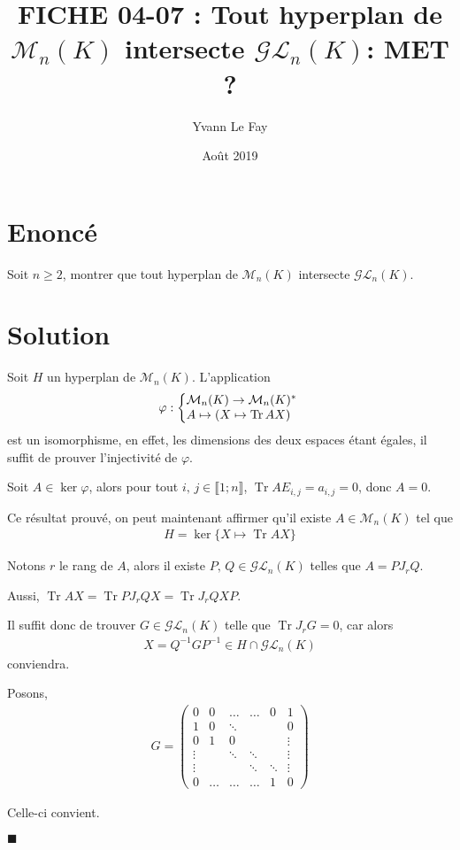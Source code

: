 \documentclass{article}
\newcommand*{\QED}{\hfill\ensuremath{\blacksquare}}%
\DeclareMathOperator{\tr}{Tr}
\begin{document}
\title{FICHE 04-07 : Tout hyperplan de $\mathcal{M}_n(K)$ intersecte $\mathcal{G}\mathcal{L}_n(K)$: MET ? }
\author{Yvann Le Fay}
\date{Août 2019}
\maketitle 
\section*{Enoncé}
Soit $n\geq 2$, montrer que tout hyperplan de $\mathcal{M}_n(K)$ intersecte $\mathcal{G}\mathcal{L}_n(K)$.
\section*{Solution}
Soit $H$ un hyperplan de $\mathcal{M}_n(K)$. L'application 
\begin{align*}
	\varphi : \left\{
		\begin{array}{@{}l@{\thinspace}l}
			\mathcal{M}_n(K)\to \mathcal{M}_n(K)^*\\
			A \mapsto (X\mapsto \tr{AX})
		\end{array}
	\right.
\end{align*}
est un isomorphisme, en effet, les dimensions des deux espaces étant égales, il suffit de prouver l'injectivité de $\varphi$.

Soit $A\in \ker \varphi$, alors pour tout $i,\,j\in \llbracket 1;n\rrbracket$, $\tr{AE_{i,j}} = a_{i,j} = 0$, donc $A=0$. 

Ce résultat prouvé, on peut maintenant affirmer qu'il existe $A\in \mathcal{M}_n(K)$ tel que 
\begin{align*}
	H = \ker \{X \mapsto \tr{AX}\}
\end{align*}

Notons $r$ le rang de $A$, alors il existe $P,\, Q\in\mathcal{G}\mathcal{L}_n(K)$ telles que $A = PJ_rQ$. 

Aussi, $\tr{AX} = \tr{PJ_rQX}=\tr{J_rQXP}$. 

Il suffit donc de trouver $G\in \mathcal{G}\mathcal{L}_n(K)$ telle que $\tr{J_rG} = 0$, car alors 
\begin{align*}
	X = Q^{-1}GP^{-1}\in H\cap \mathcal{G}\mathcal{L}_n(K)
\end{align*}
conviendra. 

Posons, 
\begin{align*}
	G = \begin{pmatrix}
		0 & 0 & \ldots & \ldots & 0 & 1\\
		1 & 0 & \ddots & & & 0\\
		0 & 1 & 0 & & & \vdots\\
		\vdots & &\ddots &\ddots & &\vdots \\
		\vdots & &&\ddots & \ddots & \vdots \\
		0 & \hdots & \hdots & \hdots & 1 & 0 
	\end{pmatrix}
\end{align*}

Celle-ci convient. 

\QED
\end{document}
